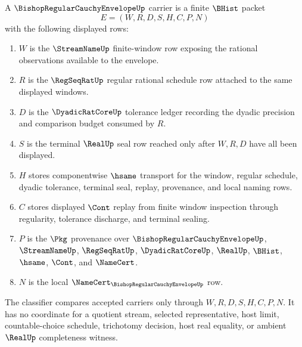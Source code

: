 \begin{definition}
\label{def:bishop-regular-cauchy-envelope-carrier}
A $\BishopRegularCauchyEnvelopeUp$ carrier is a finite $\BHist$ packet
$$
E=(W,R,D,S,H,C,P,N)
$$
with the following displayed rows:
\begin{enumerate}
\item $W$ is the $\StreamNameUp$ finite-window row exposing the rational observations available to the envelope.
\item $R$ is the $\RegSeqRatUp$ regular rational schedule row attached to the same displayed windows.
\item $D$ is the $\DyadicRatCoreUp$ tolerance ledger recording the dyadic precision and comparison budget consumed by $R$.
\item $S$ is the terminal $\RealUp$ seal row reached only after $W,R,D$ have all been displayed.
\item $H$ stores componentwise $\hsame$ transport for the window, regular schedule, dyadic tolerance, terminal seal, replay, provenance, and local naming rows.
\item $C$ stores displayed $\Cont$ replay from finite window inspection through regularity, tolerance discharge, and terminal sealing.
\item $P$ is the $\Pkg$ provenance over $\BishopRegularCauchyEnvelopeUp$, $\StreamNameUp$, $\RegSeqRatUp$, $\DyadicRatCoreUp$, $\RealUp$, $\BHist$, $\hsame$, $\Cont$, and $\NameCert$.
\item $N$ is the local $\NameCert_{\BishopRegularCauchyEnvelopeUp}$ row.
\end{enumerate}
The classifier compares accepted carriers only through $W,R,D,S,H,C,P,N$. It has no coordinate for a quotient stream, selected representative, host limit, countable-choice schedule, trichotomy decision, host real equality, or ambient $\RealUp$ completeness witness.
\end{definition}

